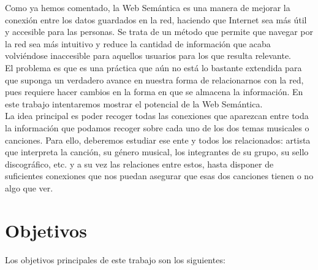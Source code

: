 Como ya hemos comentado, la Web Semántica es una manera de mejorar la conexión entre los datos guardados en la red, haciendo que Internet sea más útil y accesible para las personas. Se trata de un método que permite que navegar por la red sea más intuitivo y reduce la cantidad de información que acaba volviéndose inaccesible para aquellos usuarios para los que resulta relevante.\\

El problema es que es una práctica que aún no está lo bastante extendida para que suponga un verdadero avance en nuestra forma de relacionarnos con la red, pues requiere hacer cambios en la forma en que se almacena la información. En este trabajo intentaremos mostrar el potencial de la Web Semántica.\\

La idea principal es poder recoger todas las conexiones que aparezcan entre toda la información que podamos recoger sobre cada uno de los dos temas musicales o canciones. Para ello, deberemos estudiar ese ente y todos los relacionados: artista que interpreta la canción, su género musical, los integrantes de su grupo, su sello discográfico, etc. y a su vez las relaciones entre estos, hasta disponer de suficientes conexiones que nos puedan asegurar que esas dos canciones tienen o no algo que ver.\\

\section{Objetivos}

Los objetivos principales de este trabajo son los siguientes:\\

